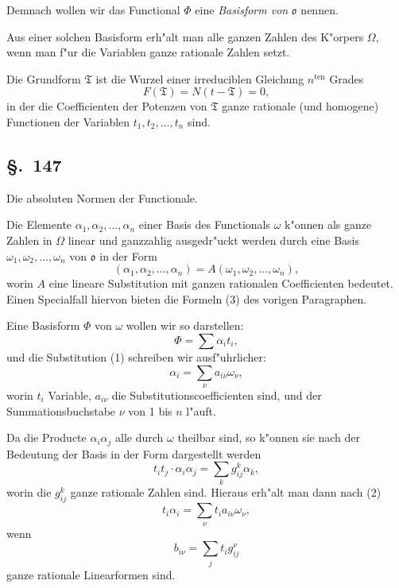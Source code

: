 \documentclass[12pt,a4paper]{article}
\theoremstyle{definition}
\begin{document}
Demnach wollen wir das Functional $\Phi$ eine \emph{Basisform von} $\mathfrak{o}$ nennen.

Aus einer solchen Basisform erh"alt man alle ganzen Zahlen des K"orpers $\Omega$, wenn man f"ur die Variablen ganze rationale Zahlen setzt.

Die Grundform $\mathfrak{T}$ ist die Wurzel einer irreduciblen Gleichung $n^{\text{ten}}$ Grades
\begin{equation}
F(\mathfrak{T}) = N(t - \mathfrak{T}) = 0,
\end{equation}
in der die Coefficienten der Potenzen von $\mathfrak{T}$ ganze rationale (und homogene) Functionen der Variablen $t_1, t_2, \dots, t_n$ sind.


\subsection*{\S.~147}

Die absoluten Normen der Functionale.

Die Elemente $\alpha_1, \alpha_2, \dots, \alpha_n$ einer Basis des Functionals $\omega$ k"onnen als ganze Zahlen in $\Omega$ linear und ganzzahlig ausgedr"uckt werden durch eine Basis $\omega_1, \omega_2, \dots, \omega_n$ von $\mathfrak{o}$ in der Form
\begin{equation}
(\alpha_1, \alpha_2, \dots, \alpha_n) = A(\omega_1, \omega_2, \dots, \omega_n),
\end{equation}
worin $A$ eine lineare Substitution mit ganzen rationalen Coefficienten bedeutet. Einen Specialfall hiervon bieten die Formeln (3) des vorigen Paragraphen.

Eine Basisform $\Phi$ von $\omega$ wollen wir so darstellen:
\begin{equation}
\Phi = \sum \alpha_i t_i,
\end{equation}
und die Substitution (1) schreiben wir ausf"uhrlicher:
\begin{equation}
\alpha_i = \sum_\nu a_{i\nu} \omega_\nu,
\end{equation}
worin $t_i$ Variable, $a_{i\nu}$ die Substitutionscoefficienten sind, und der Summationsbuchstabe $\nu$ von 1 bis $n$ l"auft.

Da die Producte $\alpha_i \alpha_j$ alle durch $\omega$ theilbar sind, so k"onnen sie nach der Bedeutung der Basis in der Form dargestellt werden
\begin{equation}
t_i t_j \cdot \alpha_i \alpha_j = \sum_k g_{ij}^k \alpha_k,
\end{equation}
worin die $g_{ij}^k$ ganze rationale Zahlen sind. Hieraus erh"alt man dann nach (2)
\begin{equation}
t_i \alpha_i = \sum_\nu t_i a_{i\nu} \omega_\nu,
\end{equation}
wenn
\begin{equation}
b_{i\nu} = \sum_j t_i g_{ij}^\nu
\end{equation}
ganze rationale Linearformen sind.
\end{document}

